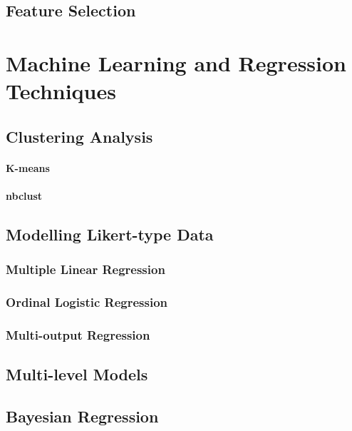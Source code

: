   \subsection{Feature Selection}

\section{Machine Learning and Regression Techniques}

  \subsection{Clustering Analysis}
    \paragraph{K-means}
    \paragraph{nbclust}

  \subsection{Modelling Likert-type Data}

    \subsubsection{Multiple Linear Regression}

    \subsubsection{Ordinal Logistic Regression}

    \subsubsection{Multi-output Regression}

  \subsection{Multi-level Models}

  \subsection{Bayesian Regression}
